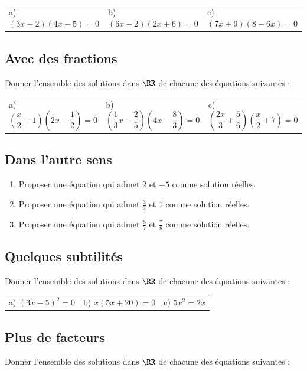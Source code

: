 \documentclass[oneside,12pt]{article}          %
\begin{document}
\begin{tabular}{p{} p{} p{}}
	a) $(3x + 2)(4x - 5) = 0$ & b) $(6x - 2)(2x + 6) = 0$ & c) $(7x + 9)(8 - 6x) = 0$ 
\end{tabular}



\subsection{Avec des fractions}
Donner l'ensemble des solutions dans $\RR$ de chacune des équations suivantes :

\begin{tabular}{p{} p{} p{}}
	a) $\left( \dfrac{x}{2} + 1 \right) \left( 2x - \dfrac{1}{2} \right) = 0$ &
	b) $\left( \dfrac{1}{3}x - \dfrac{2}{5} \right) \left( 4x - \dfrac{8}{3} \right) = 0$ &
	c) $\left( \dfrac{2x}{3} + \dfrac{5}{6} \right) \left( \dfrac{x}{2} + 7 \right) = 0$ 
\end{tabular}



\subsection{Dans l'autre sens}
\begin{enumerate}
	\item Proposer une équation qui admet $2$ et $-5$ comme solution réelles.
	\item Proposer une équation qui admet $\frac{3}{2}$ et $1$ comme solution réelles.
	\item Proposer une équation qui admet $\frac{8}{7}$ et $\frac{7}{8}$ comme solution réelles.
\end{enumerate}



\subsection{Quelques subtilités}
Donner l'ensemble des solutions dans $\RR$ de chacune des équations suivantes :

\begin{tabular}{p{} p{} p{}}
	a) $(3x - 5)^2 = 0$ &
	b) $x (5x + 20) = 0$ &
	c) $5x^2 = 2x$ 
\end{tabular}



\subsection{Plus de facteurs}
Donner l'ensemble des solutions dans $\RR$ de chacune des équations suivantes :
\end{document}

